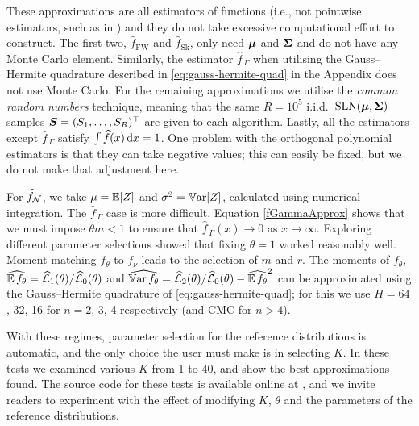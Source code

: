 These approximations are all estimators of functions (i.e., not pointwise estimators, such as in \cite{La15}) and they do not take excessive computational effort to construct. The first two, $\widehat{f}_{\mathrm{FW}}$ and $\widehat{f}_{\mathrm{Sk}}$, only need $\bm{\mu}$ and $\bm{\Sigma}$ and do not have any Monte Carlo element. Similarly, the estimator $\widehat{f}_{\,\Gamma}$ when utilising the Gauss--Hermite quadrature described in \eqref{eq:gauss-hermite-quad}
in the Appendix does not use Monte Carlo. For the remaining approximations we utilise the \emph{common random numbers} technique, meaning that the same $R=10^5$ i.i.d.\ $\mathrm{SLN}(\bm{\mu}, \bm{\Sigma})$ samples $\bm{S} = (S_1, \dots, S_R)^\top$ are given to each algorithm. Lastly, all the estimators except $\widehat{f}_{\,\Gamma}$ satisfy $\int \widehat{f}(x) \dif x = 1$. One problem with the orthogonal polynomial estimators is that they can take negative values; this can easily be fixed, but we do not make that adjustment here.



For $\widehat{f}_{\mathcal{N}}$, we take $\mu = \operatorname{{\mathbb E}}[Z]$ and $\sigma^2 = \operatorname{\mathbb{V}\mathrm{ar}}[Z]$, calculated using numerical integration.
The $\widehat{f}_{\,\Gamma}$ case is more difficult. Equation \eqref{fGammaApprox} shows that we must impose $\theta m < 1$ to ensure that $\widehat{f}_{\,\Gamma}(x)\to 0$ as $x\to \infty$.
Exploring different parameter selections showed that fixing $\theta = 1$ worked reasonably well. Moment matching $f_\theta$ to $f_\nu$ leads to the selection of $m$ and $r$. The moments of $f_\theta$,
$ \widehat{\operatorname{{\mathbb E}} f_\theta} = \widehat{\mathcal{L}}_1(\theta) / \widehat{\mathcal{L}}_0(\theta)$  and
 $\widehat{\operatorname{\mathbb{V}\mathrm{ar}} f_\theta} = \widehat{\mathcal{L}}_2(\theta) / \widehat{\mathcal{L}}_0(\theta) - \widehat{\operatorname{{\mathbb E}} f_\theta}^2  $
can be approximated using the Gauss--Hermite quadrature of \eqref{eq:gauss-hermite-quad}; for this we use $H = 64$, 32, 16 for $n=2$, 3, 4 respectively (and CMC for $n > 4$).

With these regimes, parameter selection for the reference distributions is automatic, and the only choice the user must make is in selecting $K$. In these tests we examined various $K$ from 1 to 40, and show the best approximations found.
The source code for these tests is available online at \cite{OrthogoCode}, and we invite readers to experiment with the effect of modifying $K$, $\theta$ and the parameters of the reference distributions.

